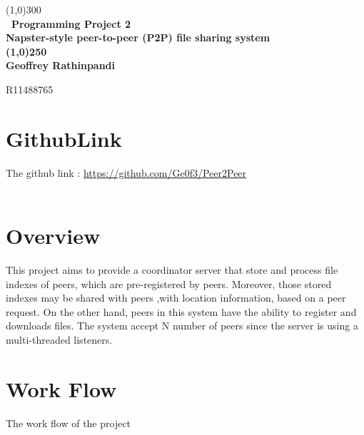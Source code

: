 \documentclass{article}
\begin{document}
\begin{titlepage}
	\begin{center}
	\line(1,0){300}\\
	[0.25in]
	\huge\bfseries\ Programming Project 2 \\Napster-style peer-to-peer (P2P) file sharing system \\
	
	
	\line(1,0){250}\\
	\bfseries {Geoffrey Rathinpandi}\\
	\end{center}
	
	

	\begin{flushright}
	\textsc{R11488765}\\
	
	
	\end{flushright}
	\tableofcontents
\end{titlepage}
\section{GithubLink}
The github link :  \url{https://github.com/Ge0f3/Peer2Peer } \\ \\

\section{Overview}

This project aims to provide a coordinator server that store and process file
indexes of peers, which are pre-registered by peers. Moreover, those stored indexes may be shared with peers ,with location information, based on a peer request. On the other hand, peers in this system have the ability to register and downloads files. The system accept N number of peers since the server is using a multi-threaded listeners.


\section{Work Flow}

The work flow of the project  \\
\end{document}
